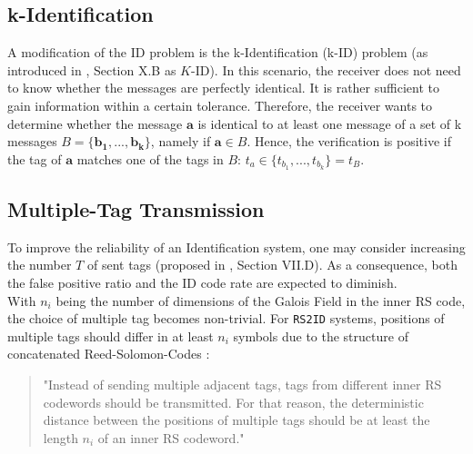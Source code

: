 \documentclass[english,BCOR=4mm,cdfont=false]{tudscrreprt} %
\begin{document}
\subsection{k-Identification}
A modification of the ID problem is the k-Identification (k-ID) problem (as introduced in \cite{Codes_for_ID_Tutorial}, Section X.B as $K$-ID). In this scenario, the receiver does not need to know whether the messages are perfectly identical. It is rather sufficient to gain information within a certain tolerance. 
Therefore, the receiver wants to determine whether the message $\boldsymbol{a}$ is identical to at least one message of a set of k messages $B = \{\boldsymbol{b_1},...,\boldsymbol{b_k}\}$, namely if 
$\boldsymbol{a} \in B$. Hence, the verification is positive if the tag of $\boldsymbol{a}$ matches one of the tags in $B$: $t_a \in \{t_{b_1},...,t_{b_k}\} = t_B$.

\subsection{Multiple-Tag Transmission}
\label{sec:multiple-tag transmission}
To improve the reliability of an Identification system, one may consider increasing the number $T$ of sent tags (proposed in \cite{Codes_for_ID_Tutorial}, Section VII.D). As a consequence, both the false positive ratio and the ID code rate are expected to diminish. \\
With $n_i$ being the number of dimensions of the Galois Field in the inner RS code, the choice of multiple tag becomes non-trivial. For \texttt{RS2ID} systems, positions of multiple tags  should differ in at least $n_i$ symbols due to the structure of concatenated Reed-Solomon-Codes \cite{von_lengerke_identification_2023}: 
\begin{quote}
    "Instead of sending multiple adjacent tags, tags from different
    inner RS codewords should be transmitted. For that reason, the
    deterministic distance between the positions of multiple tags
    should be at least the length $n_i$ of an inner RS codeword." 
\end{quote}
\end{document}
